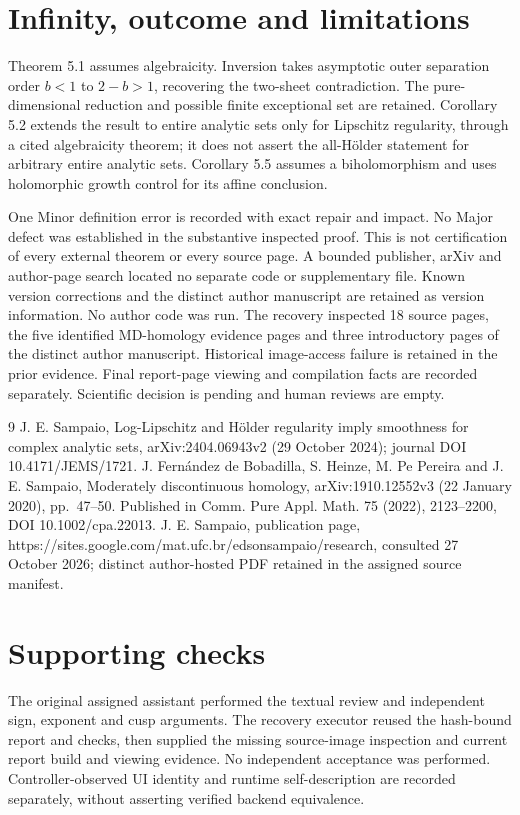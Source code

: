 \documentclass[10pt]{article}
\begin{document}
\section*{Infinity, outcome and limitations}
Theorem 5.1 assumes algebraicity. Inversion takes asymptotic outer separation order \(b<1\) to \(2-b>1\), recovering the two-sheet contradiction. The pure-dimensional reduction and possible finite exceptional set are retained. Corollary 5.2 extends the result to entire analytic sets only for Lipschitz regularity, through a cited algebraicity theorem; it does not assert the all-Hölder statement for arbitrary entire analytic sets. Corollary 5.5 assumes a biholomorphism and uses holomorphic growth control for its affine conclusion.\par
One Minor definition error is recorded with exact repair and impact. No Major defect was established in the substantive inspected proof. This is not certification of every external theorem or every source page. A bounded publisher, arXiv and author-page search located no separate code or supplementary file. Known version corrections and the distinct author manuscript are retained as version information. No author code was run. The recovery inspected 18 source pages, the five identified MD-homology evidence pages and three introductory pages of the distinct author manuscript. Historical image-access failure is retained in the prior evidence. Final report-page viewing and compilation facts are recorded separately. Scientific decision is pending and human reviews are empty.\par
9 J. E. Sampaio, Log-Lipschitz and Hölder regularity imply smoothness for complex analytic sets, arXiv:2404.06943v2 (29 October 2024); journal DOI 10.4171/JEMS/1721. J. Fernández de Bobadilla, S. Heinze, M. Pe Pereira and J. E. Sampaio, Moderately discontinuous homology, arXiv:1910.12552v3 (22 January 2020), pp. 47–50. Published in Comm. Pure Appl. Math. 75 (2022), 2123–2200, DOI 10.1002/cpa.22013. J. E. Sampaio, publication page, https://sites.google.com/mat.ufc.br/edsonsampaio/research, consulted 27 October 2026; distinct author-hosted PDF retained in the assigned source manifest.\par
\section*{Supporting checks}
The original assigned assistant performed the textual review and independent sign, exponent and cusp arguments. The recovery executor reused the hash-bound report and checks, then supplied the missing source-image inspection and current report build and viewing evidence. No independent acceptance was performed. Controller-observed UI identity and runtime self-description are recorded separately, without asserting verified backend equivalence.\par
\end{document}
